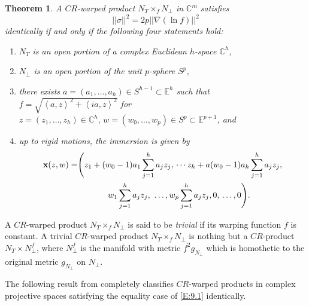 \documentclass{amsart}
\theoremstyle{plain}
\newtheorem{theorem}{Theorem}[section]
\numberwithin{equation}{section}
\theoremstyle{remark}
\numberwithin{equation}{section}
\begin{document}
\begin{theorem}\label{T:9.3} A $CR$-warped product $N_T\times_{f} N_\perp$ in  $\mathbb C^m$ satisfies
\begin{equation}||\sigma||^2= 2p||\nabla (\ln f)||^2\end{equation} identically if and only if the following four statements hold:
\begin{enumerate}
\item[(i)] $N_T$ is an open portion of a complex Euclidean $h$-space $\mathbb C^h$,

\item[(ii)] $N_\perp$ is an open portion of the unit $p$-sphere $S^p$, 

\item[(iii)] there exists  $a=(a_1,\ldots,a_h)\in S^{h-1}\subset {\mathbb E}^h$ such that $f=\sqrt{\left<a,z\right>^2 +\left<ia,z\right>^2}$ for  $z=(z_1,\ldots,z_h)\in{\mathbb C}^h,\, w=(w_0,\ldots,w_p)\in S^p\subset {\mathbb E}^{p+1}$, and

\item[(iv)] up to rigid motions, the immersion is given by
\begin{align}\notag \hbox{\bf x}(z,w)=&\Bigg(  z_1+(w_0-1)a_1\sum_{j=1}^h
a_jz_j,\,\cdots z_h+a(w_0-1)a_h\sum_{j=1}^ha_jz_j,\\& \hskip.5in w_1\sum_{j=1}^h a_jz_j,\,\,\ldots,w_p\sum_{j=1}^h a_jz_j,0,\,\ldots,0\Bigg).\notag\notag\end{align}
\end{enumerate}\end{theorem}

A $CR$-warped product $N_T\times_f N_\perp$ is said to be {\it trivial\/} if its warping function $f$ is constant. A trivial $CR$-warped product $N_T\times_f N_\perp$ is nothing but a $CR$-product $N_T\times N_\perp^f$, where $N_\perp^f$ is the  manifold  with metric $f^2g_{N_\perp}$ which is  homothetic to the original metric $g_{N_\perp}$ on $N_\perp$.
 

The following result from \cite{c8} completely classifies $CR$-warped products in complex projective spaces satisfying the equality case of \eqref{E:9.1} identically.
\end{document}

